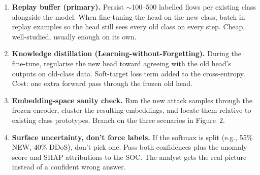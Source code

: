 \documentclass[11pt,a4paper]{article}
\begin{document}
\begin{enumerate}[leftmargin=*, itemsep=3pt]
  \item \textbf{Replay buffer (primary).} Persist $\sim$100--500 labelled flows per existing class alongside the model. When fine-tuning the head on the new class, batch in replay examples so the head still sees every old class on every step. Cheap, well-studied, usually enough on its own.

  \item \textbf{Knowledge distillation (Learning-without-Forgetting).} During the fine-tune, regularise the new head toward agreeing with the old head's outputs on old-class data. Soft-target loss term added to the cross-entropy. Cost: one extra forward pass through the frozen old head.

  \item \textbf{Embedding-space sanity check.} Run the new attack samples through the frozen encoder, cluster the resulting embeddings, and locate them relative to existing class prototypes. Branch on the three scenarios in Figure~2.

  \item \textbf{Surface uncertainty, don't force labels.} If the softmax is split (e.g., 55\% NEW, 40\% DDoS), don't pick one. Pass both confidences plus the anomaly score and SHAP attributions to the SOC. The analyst gets the real picture instead of a confident wrong answer.
\end{enumerate}
\end{document}
